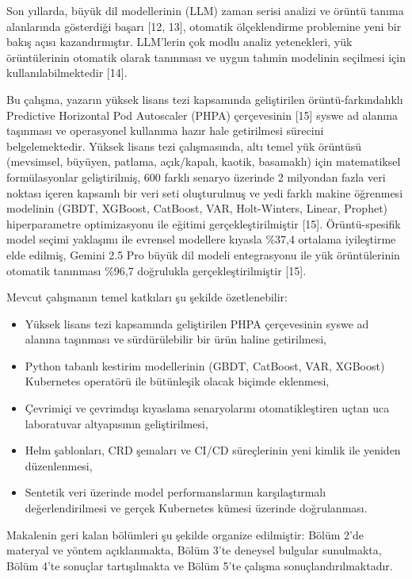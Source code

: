 \documentclass[12pt,a4paper]{article}
\begin{document}
Son yıllarda, büyük dil modellerinin (LLM) zaman serisi analizi ve örüntü tanıma alanlarında gösterdiği başarı [12, 13], otomatik ölçeklendirme problemine yeni bir bakış açısı kazandırmıştır. LLM'lerin çok modlu analiz yetenekleri, yük örüntülerinin otomatik olarak tanınması ve uygun tahmin modelinin seçilmesi için kullanılabilmektedir [14].

Bu çalışma, yazarın yüksek lisans tezi kapsamında geliştirilen örüntü-farkındalıklı Predictive Horizontal Pod Autoscaler (PHPA) çerçevesinin [15] syswe ad alanına taşınması ve operasyonel kullanıma hazır hale getirilmesi sürecini belgelemektedir.
Yüksek lisans tezi çalışmasında, altı temel yük örüntüsü (mevsimsel, büyüyen, patlama, açık/kapalı, kaotik, basamaklı) için matematiksel formülasyonlar geliştirilmiş, 600 farklı senaryo üzerinde 2 milyondan fazla veri noktası içeren kapsamlı bir veri seti oluşturulmuş ve yedi farklı makine öğrenmesi modelinin (GBDT, XGBoost, CatBoost, VAR, Holt-Winters, Linear, Prophet) hiperparametre optimizasyonu ile eğitimi gerçekleştirilmiştir [15]. Örüntü-spesifik model seçimi yaklaşımı ile evrensel modellere kıyasla \%37,4 ortalama iyileştirme elde edilmiş, Gemini 2.5 Pro büyük dil modeli entegrasyonu ile yük örüntülerinin otomatik tanınması \%96,7 doğrulukla gerçekleştirilmiştir [15].

Mevcut çalışmanın temel katkıları şu şekilde özetlenebilir:

\begin{itemize}[noitemsep]
  \item Yüksek lisans tezi kapsamında geliştirilen PHPA çerçevesinin syswe ad alanına taşınması ve sürdürülebilir bir ürün haline getirilmesi,
  \item Python tabanlı kestirim modellerinin (GBDT, CatBoost, VAR, XGBoost) Kubernetes operatörü ile bütünleşik olacak biçimde eklenmesi,
  \item Çevrimiçi ve çevrimdışı kıyaslama senaryolarını otomatikleştiren uçtan uca laboratuvar altyapısının geliştirilmesi,
  \item Helm şablonları, CRD şemaları ve CI/CD süreçlerinin yeni kimlik ile yeniden düzenlenmesi,
  \item Sentetik veri üzerinde model performanslarının karşılaştırmalı değerlendirilmesi ve gerçek Kubernetes kümesi üzerinde doğrulanması.
\end{itemize}

Makalenin geri kalan bölümleri şu şekilde organize edilmiştir: Bölüm 2'de materyal ve yöntem açıklanmakta, Bölüm 3'te deneysel bulgular sunulmakta, Bölüm 4'te sonuçlar tartışılmakta ve Bölüm 5'te çalışma sonuçlandırılmaktadır.
\end{document}
